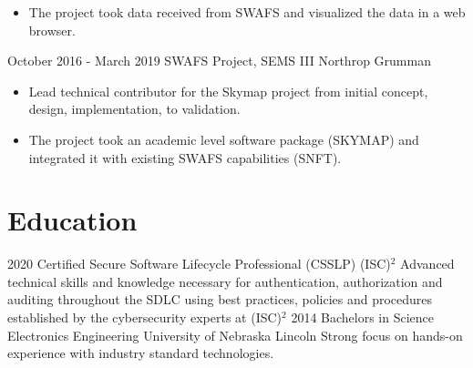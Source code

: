 \documentclass[]{src/friggeri-cv}
\begin{document}
\begin{entrylist}
{\begin{itemize}
        \item The project took data received from SWAFS and visualized the data in a web browser.
    \end{itemize}}
  \entry
    {October 2016 - March 2019}
    {SWAFS Project, SEMS III}
    {Northrop Grumman}
    {\begin{itemize}
        \item Lead technical contributor for the Skymap project from initial concept, design, implementation, to validation.
        \item The project took an academic level software package (SKYMAP) and integrated it with existing SWAFS capabilities (SNFT).
    \end{itemize}}
\end{entrylist}

\section{Education}
\begin{entrylist}
  \entry
    {2020}
    {Certified Secure Software Lifecycle Professional (CSSLP)}
    {(ISC)\color{pblue}\(^2\)}
    {Advanced technical skills and knowledge necessary for authentication, authorization and auditing throughout the SDLC using best practices, policies and procedures established by the cybersecurity experts at (ISC)\(^2\)}
  \entry
    {2014}
    {Bachelors in Science Electronics Engineering}
    {University of Nebraska Lincoln}
    {Strong focus on hands-on experience with industry standard technologies.}
\end{entrylist}
\end{document}
